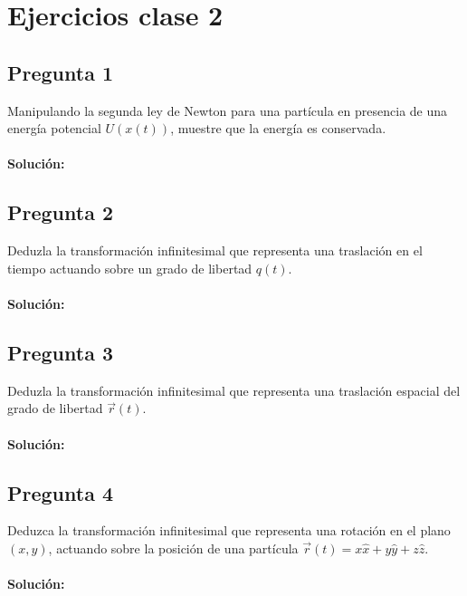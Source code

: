 \documentclass[../main_ej.tex]{subfiles}
\begin{document}
\section{Ejercicios clase 2}
\subsection{Pregunta 1}
Manipulando la segunda ley de Newton para una partícula en presencia de una energía potencial $U(x(t))$, muestre que la energía es conservada. \\
\\
\textbf{Solución:}
\subsection{Pregunta 2}
Deduzla la transformación infinitesimal que representa una traslación en el tiempo actuando sobre un grado de libertad $q(t)$. \\
\\
\textbf{Solución:}
\subsection{Pregunta 3}
Deduzla la transformación infinitesimal que representa una traslación espacial del grado de libertad $\vec{r}(t)$.
\\
\\
\textbf{Solución:}
\subsection{Pregunta 4}
Deduzca la transformación infinitesimal que representa una rotación en el plano $(x,y)$, actuando sobre la posición de una partícula $\vec{r}(t)=x\hat{x}+y\hat{y}+z\hat{z}$.
\\
\\
\textbf{Solución:}
\end{document}
